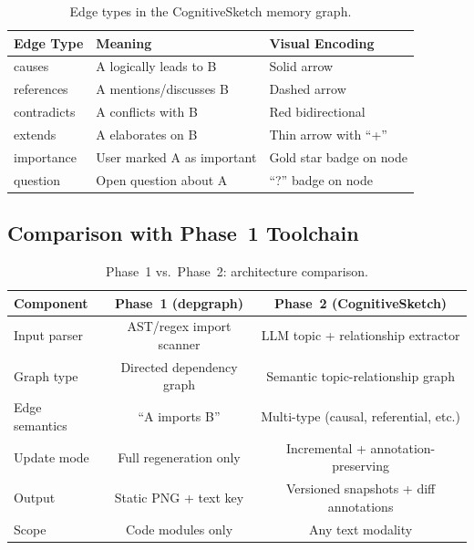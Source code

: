 \documentclass[11pt,a4paper]{article}
\begin{document}
\begin{table}[h]
\centering
\caption{Edge types in the CognitiveSketch memory graph.}
\begin{tabular}{@{}lll@{}}
\toprule
\textbf{Edge Type} & \textbf{Meaning} & \textbf{Visual Encoding} \\
\midrule
causes       & A logically leads to B     & Solid arrow \\
references   & A mentions/discusses B     & Dashed arrow \\
contradicts  & A conflicts with B         & Red bidirectional \\
extends      & A elaborates on B          & Thin arrow with ``+'' \\
importance   & User marked A as important & Gold star badge on node \\
question     & Open question about A      & ``?'' badge on node \\
\bottomrule
\end{tabular}
\end{table}

\subsection{Comparison with Phase~1 Toolchain}

\begin{table}[h]
\centering
\caption{Phase~1 vs.\ Phase~2: architecture comparison.}
\begin{tabular}{@{}lcc@{}}
\toprule
\textbf{Component} & \textbf{Phase~1 (depgraph)} & \textbf{Phase~2 (CognitiveSketch)} \\
\midrule
Input parser   & AST/regex import scanner & LLM topic + relationship extractor \\
Graph type     & Directed dependency graph & Semantic topic-relationship graph \\
Edge semantics & ``A imports B''           & Multi-type (causal, referential, etc.) \\
Update mode    & Full regeneration only    & Incremental + annotation-preserving \\
Output         & Static PNG + text key     & Versioned snapshots + diff annotations \\
Scope          & Code modules only         & Any text modality \\
\midrule
\end{tabular}
\end{table}


\end{document}
